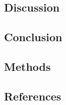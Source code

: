 \documentclass[
]{article}
\begin{document}
\newpage

\hypertarget{discussion}{%
\subsection{Discussion}\label{discussion}}

\newpage

\hypertarget{conclusion}{%
\subsection{Conclusion}\label{conclusion}}

\newpage

\hypertarget{methods}{%
\subsection{Methods}\label{methods}}

\newpage

\hypertarget{references}{%
\subsection*{References}\label{references}}
\end{document}
